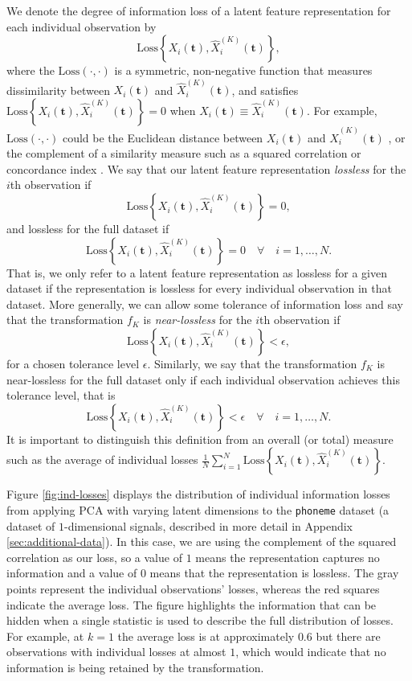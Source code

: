 We denote the degree of information loss of a latent feature representation for each individual observation by 
$$
\text{Loss} \left\{ X_i(\mathbf{t}), \widehat{X}_i^{(K)}(\mathbf{t}) \right\},
$$
where the $\text{Loss}(\cdot, \cdot)$ is a symmetric, non-negative function that measures dissimilarity between $X_i(\mathbf{t})$ and $\widehat{X}_i^{(K)}(\mathbf{t})$, and satisfies $\text{Loss}\left\{ X_i(\mathbf{t}), \widehat{X}_i^{(K)}(\mathbf{t}) \right\}=0$ when $X_i(\mathbf{t}) \equiv \widehat{X}_i^{(K)}(\mathbf{t})$.
For example, $\text{Loss}(\cdot, \cdot)$ could be the Euclidean distance between $X_i(\mathbf{t})$ and $\widehat{X}_i^{(K)}(\mathbf{t})$ \parencite{morris_comparison_2017}, or the complement of a similarity measure such as a squared correlation or concordance index \parencite{yang_quantile_2020}.
We say that our latent feature representation \emph{lossless} for the $i$th observation if
$$
\text{Loss} \left\{X_i(\mathbf{t}), \widehat{X}_i^{(K)}(\mathbf{t}) \right\} = 0,
$$
and lossless for the full dataset if
$$
\text{Loss} \left\{ X_i(\mathbf{t}), \widehat{X}_i^{(K)}(\mathbf{t}) \right\} = 0 \quad \forall \quad  i = 1, \dots, N.
$$
That is, we only refer to a latent feature representation as lossless for a given dataset if the representation is lossless for every individual observation in that dataset.
More generally, we can allow some tolerance of information loss and say that
the transformation $f_K$ is \emph{near-lossless} for the $i$th observation if
$$
\text{Loss} \left\{ X_i(\mathbf{t}), \widehat{X}_i^{(K)}(\mathbf{t}) \right\} < \epsilon,
$$
for a chosen tolerance level $\epsilon$. 
Similarly, we say that the transformation $f_K$ is near-lossless for the full dataset only if each individual observation achieves this tolerance level, that is
$$
\text{Loss} \left\{ X_i(\mathbf{t}), \widehat{X}_i^{(K)}(\mathbf{t}) \right\} < \epsilon \quad \forall \quad  i = 1, \dots, N.
$$
It is important to distinguish this definition from an overall (or total) measure such as the average of individual losses $\frac{1}{N}\sum_{i=1}^N \text{Loss} \left\{ X_i(\mathbf{t}), \widehat{X}_i^{(K)}(\mathbf{t}) \right\}$.

Figure \ref{fig:ind-losses} displays the distribution of individual information losses from applying PCA with varying latent dimensions to the \texttt{phoneme} dataset (a dataset of $1$-dimensional signals, described in more detail in Appendix \ref{sec:additional-data}).
In this case, we are using the complement of the squared correlation as our loss, so a value of $1$ means the representation captures no information and a value of $0$ means that the representation is lossless.
The gray points represent the individual observations' losses, whereas the red squares indicate the average loss.
The figure highlights the information that can be hidden when a single statistic is used to describe the full distribution of losses. For example, at $k = 1$ the average loss is at approximately $0.6$ but there are observations with individual losses at almost $1$, which would indicate that no information is being retained by the transformation.


